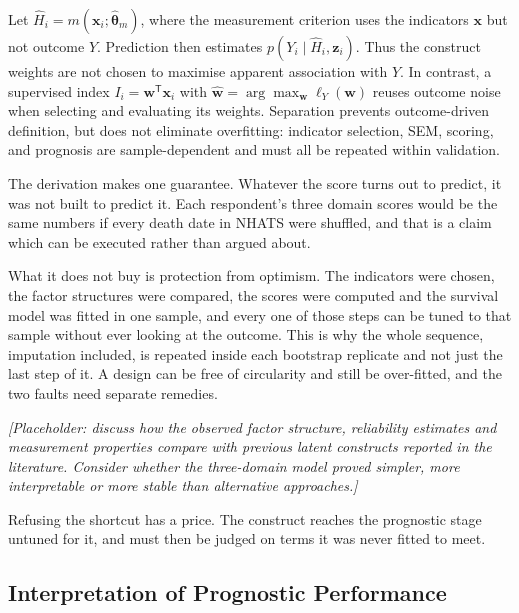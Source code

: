 \begin{derivation}
\label{der:noncircularity}
Let $\widehat H_i=m(\mathbf x_i;\widehat{\boldsymbol\theta}_m)$, where the
measurement criterion uses the indicators $\mathbf x$ but not outcome $Y$.
Prediction then estimates $p(Y_i\mid\widehat H_i,\mathbf z_i)$. Thus the
construct weights are not chosen to maximise apparent association with $Y$.
In contrast, a supervised index $I_i=\mathbf w^{\mathsf T}\mathbf x_i$ with
$\widehat{\mathbf w}=\arg\max_{\mathbf w}\ell_Y(\mathbf w)$ reuses outcome noise
when selecting and evaluating its weights. Separation prevents outcome-driven
definition, but does not eliminate overfitting: indicator selection, SEM, scoring,
and prognosis are sample-dependent and must all be repeated within validation.
\end{derivation}

\begin{reading}
The derivation makes one guarantee. Whatever the score turns out to predict, it
was not built to predict it. Each respondent's three domain scores would be the
same numbers if every death date in NHATS were shuffled, and that is a claim which
can be executed rather than argued about.

What it does not buy is protection from optimism. The indicators were chosen,
the factor structures were compared, the scores were computed and the survival
model was fitted in one sample, and every one of those steps can be tuned to
that sample without ever looking at the outcome. This is why the whole
sequence, imputation included, is repeated inside each bootstrap replicate and
not just the last step of it. A design can be free of circularity and still be
over-fitted, and the two faults need separate remedies.
\end{reading}

\medskip
\noindent\emph{[Placeholder: discuss how the observed factor structure, reliability estimates and measurement properties compare with previous latent constructs reported in the literature. Consider whether the three-domain model proved simpler, more interpretable or more stable than alternative approaches.]}

Refusing the shortcut has a price. The construct reaches the prognostic stage
untuned for it, and must then be judged on terms it was never fitted to meet.

\subsection{Interpretation of Prognostic Performance}
\label{sec:disc-prognostic}

